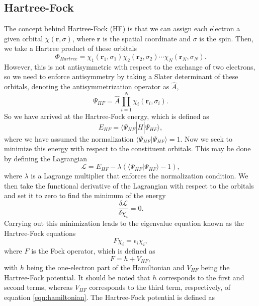 \documentclass[12pt]{caltech_thesis}
\begin{document}
\subsection{Hartree-Fock\autocite{szabo_modern_2012}}
\label{sec:hf}
The concept behind Hartree-Fock (HF) is that we can assign each electron a given orbital $\chi (\mathbf{r}, \sigma)$, where $\mathbf{r}$ is the spatial coordinate and $\sigma$ is the spin. Then, we take a Hartree product of these orbitals
\begin{equation}
    \Phi _{Hartree} = \chi _1(\mathbf{r}_1, \sigma_1) \chi _2(\mathbf{r}_2, \sigma_2) \cdots \chi _N(\mathbf{r}_N, \sigma_N).
\end{equation}
However, this is not antisymmetric with respect to the exchange of two electrons, so we need to enforce antisymmetry by taking a Slater determinant of these orbitals, denoting the antisymmetrization operator as $\hat{A}$,
\begin{equation}
    \Psi _{HF} = \hat{A} \prod_{i=1}^{N} \chi _i(\mathbf{r}_i, \sigma_i) .
\end{equation}
So we have arrived at the Hartree-Fock energy, which is defined as
\begin{equation}
    E_{HF} = \langle \Psi _{HF} | \hat{H} | \Psi _{HF} \rangle,
\end{equation}
where we have assumed the normalization $\langle \Psi _{HF} | \Psi _{HF} \rangle = 1$.
Now we seek to minimize this energy with respect to the constituent orbitals. This may be done by defining the Lagrangian
\begin{equation}
    \mathcal{L} = E_{HF} - \lambda \left( \langle \Psi _{HF} | \Psi _{HF} \rangle - 1 \right),
\end{equation}
where $\lambda$ is a Lagrange multiplier that enforces the normalization condition. We then take the functional derivative of the Lagrangian with respect to the orbitals and set it to zero to find the minimum of the energy
\begin{equation}
    \frac{\delta \mathcal{L}}{\delta \chi _i} = 0.
\end{equation}
Carrying out this minimization leads to the eigenvalue equation known as the Hartree-Fock equations
\begin{equation}
    F\chi _i = \epsilon _i \chi _i,
\end{equation}
where $F$ is the Fock operator, which is defined as
\begin{equation}
    F = h + V_{HF},
\end{equation}
with $h$ being the one-electron part of the Hamiltonian and $V_{HF}$ being the Hartree-Fock potential. It should be noted that $h$ corresponds to the first and second terms, whereas $V_{HF}$ corresponds to the third term, respectively, of equation \ref{eqn:hamiltonian}. The Hartree-Fock potential is defined as
\end{document}
